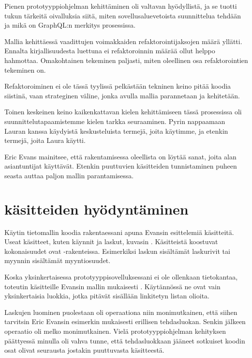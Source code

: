 Pienen prototyyppiohjelman kehittäminen oli valtavan hyödyllistä, ja se
tuotti tukun tärkeitä oivalluksia siitä, miten sovellusaluevetoista
suunnittelua tehdään ja mikä on GraphQL:n merkitys prosessissa.

Mallia kehittäessä vaadittujen voimakkaiden refaktorointijaksojen määrä
yllätti. Ennalta kirjallisuudesta luettuna ei refaktoroinnin määrää
ollut helppo hahmottaa. Omakohtainen tekeminen paljasti, miten
oleellinen osa 
refaktorointien tekeminen on.

Refaktoroiminen ei ole tässä tyylissä pelkästään tekninen keino pitää
koodia siistinä, vaan strateginen väline, jonka avulla mallia
parannetaan ja  kehitetään.

Toinen keskeinen keino kaikenkattavan kielen kehittämiseen tässä
prosessissa oli suunnittelutapaamistemme kielen tarkka seuraaminen.
Pyrin nappaamaan Lauran kanssa käydyistä keskusteluista termejä, joita
käytimme, ja etenkin termejä, joita Laura käytti.

Eric Evans mainitsee, että 
rakentamisessa oleellista on löytää sanat, joita alan asiantuntijat
käyttävät. Etenkin puuttuvien käsitteiden tunnistaminen puheen seasta
auttaa paljon mallin parantamisessa. \cite{evans:ddd}

\hypertarget{kuxe4sitteiden-hyuxf6dyntuxe4minen}{%
\section{\texorpdfstring{
käsitteiden
hyödyntäminen}{ käsitteiden hyödyntäminen}}\label{kuxe4sitteiden-hyuxf6dyntuxe4minen}}

Käytin tietomallin koodia rakentaessani apuna Evansin esittelemiä
käsitteitä. Useat käsitteet, kuten käynnit ja laskut, kuvasin
. Käsitteistä koostuvat kokonaisuudet
ovat -rakenteissa. Esimerkiksi laskun
sisältämät laskurivit tai myynnin sisältämät myyntiosuudet.

Koska yksinkertaisessa prototyyppisovelluksessani ei ole ollenkaan
tietokantaa, toteutin käsitteille Evansin mallin mukaisesti
. Käytännössä ne ovat vain
yksinkertaisia luokkia, jotka pitävät sisällään linkitetyn listan
olioita.

Laskujen luominen puolestaan oli operaationa niin monimutkainen, että
siihen tarvitsin Eric Evansin esimerkin mukaisesti erillisen
tehdasluokan. Senkin jälkeen operaatio oli melko monimutkainen. Vielä
prototyyppiohjelman kehityksen päättyessä minulla oli vahva tunne, että
tehdasluokkaan jääneet sotkuiset koodin osat olivat seurausta jostakin
puuttuvasta käsitteestä.

